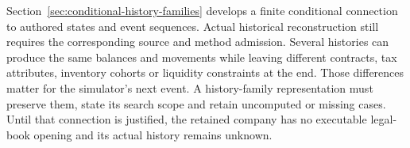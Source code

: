 Section~\ref{sec:conditional-history-families} develops a finite conditional
connection to authored states and event sequences. Actual historical
reconstruction still requires the corresponding source and method admission. Several histories can produce the same balances
and movements while leaving different contracts, tax attributes, inventory
cohorts or liquidity constraints at the end. Those differences matter for the
simulator's next event. A history-family representation must preserve them,
state its search scope and retain uncomputed or missing cases. Until that
connection is justified, the retained company has no executable legal-book
opening and its actual history remains unknown.
